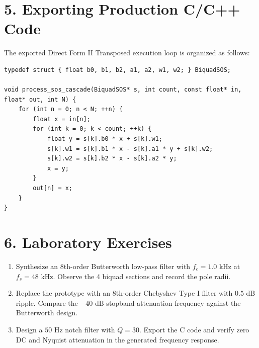 \documentclass[11pt,a4paper]{article}
\begin{document}
\section*{5. Exporting Production C/C++ Code}
The exported Direct Form II Transposed execution loop is organized as follows:
\begin{verbatim}
typedef struct { float b0, b1, b2, a1, a2, w1, w2; } BiquadSOS;

void process_sos_cascade(BiquadSOS* s, int count, const float* in, float* out, int N) {
    for (int n = 0; n < N; ++n) {
        float x = in[n];
        for (int k = 0; k < count; ++k) {
            float y = s[k].b0 * x + s[k].w1;
            s[k].w1 = s[k].b1 * x - s[k].a1 * y + s[k].w2;
            s[k].w2 = s[k].b2 * x - s[k].a2 * y;
            x = y;
        }
        out[n] = x;
    }
}
\end{verbatim}

\section*{6. Laboratory Exercises}
\begin{enumerate}[leftmargin=20pt,itemsep=2pt]
\item Synthesize an 8th-order Butterworth low-pass filter with $f_c = 1.0\text{ kHz}$ at $f_s = 48\text{ kHz}$. Observe the 4 biquad sections and record the pole radii.
\item Replace the prototype with an 8th-order Chebyshev Type I filter with $0.5\text{ dB}$ ripple. Compare the $-40\text{ dB}$ stopband attenuation frequency against the Butterworth design.
\item Design a $50\text{ Hz}$ notch filter with $Q = 30$. Export the C code and verify zero DC and Nyquist attenuation in the generated frequency response.
\end{enumerate}
\end{document}
